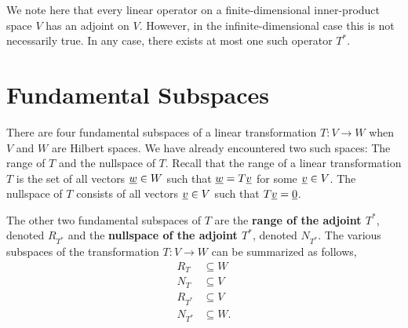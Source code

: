 We note here that every linear operator on a finite-dimensional inner-product space $V$ has an adjoint on $V$.
However, in the infinite-dimensional case this is not necessarily true.
In any case, there exists at most one such operator $T^*$.


\section{Fundamental Subspaces}

There are four fundamental subspaces of a linear transformation $T \colon V \rightarrow W$ when $V$ and $W$ are Hilbert spaces.
We have already encountered two such spaces: The range of $T$ and the nullspace of $T$.
Recall that the range of a linear transformation $T$ is the set of all vectors $\underline{w} \in W$ such that $\underline{w} = T \underline{v}$ for some $\underline{v} \in V$.
The nullspace of $T$ consists of all vectors $\underline{v} \in V$ such that $T \underline{v} = \underline{0}$.

The other two fundamental subspaces of $T$ are the \textbf{range of the adjoint $T^*$}, denoted $R_{T^*}$ and the \textbf{nullspace of the adjoint $T^*$}, denoted $N_{T^*}$.
The various subspaces of the transformation $T \colon V \rightarrow W$ can be summarized as follows,
\begin{align*}
R_T &\subseteq W \\
N_T &\subseteq V \\
R_{T^*} &\subseteq V \\
N_{T^*} &\subseteq W .
\end{align*}

